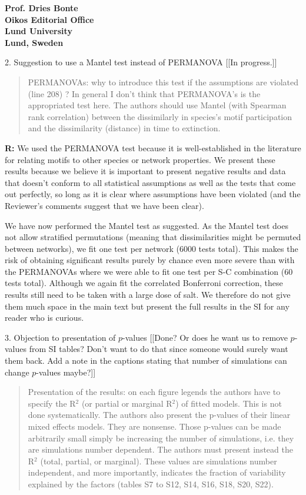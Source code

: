 \documentclass[12pt]{letter}
\begin{document}
\begin{letter}{\bf Prof. Dries Bonte\\
Oikos Editorial Office \\
Lund University \\
Lund, Sweden}
    \smallskip

    2. Suggestion to use a Mantel test instead of PERMANOVA [[In progress.]]

      \begin{quotation}
        PERMANOVAs: why to introduce this test if the assumptions are violated (line 208) ? In general I don’t think that PERMANOVA’s is the appropriated test here. The authors should use Mantel (with Spearman rank correlation) between the dissimilarly in species’s motif participation and the dissimilarity (distance) in time to extinction.
      \end{quotation}

      \smallskip

      \textbf{R:} We used the PERMANOVA test because it is well-established in the literature for relating motifs to other species or network properties. We present these results because we believe it is important to present negative results and data that doesn't conform to all statistical assumptions as well as the tests that come out perfectly, so long as it is clear where assumptions have been violated (and the Reviewer's comments suggest that we have been clear). 

      We have now performed the Mantel test as suggested. As the Mantel test does not allow stratified permutations (meaning that dissimilarities might be permuted between networks), we fit one test per network (6000 tests total). This makes the risk of obtaining significant results purely by chance even more severe than with the PERMANOVAs where we were able to fit one test per S-C combination (60 tests total). Although we again fit the correlated Bonferroni correction, these results still need to be taken with a large dose of salt. We therefore do not give them much space in the main text but present the full results in the SI for any reader who is curious.

    \smallskip

    3. Objection to presentation of $p$-values [[Done? Or does he want us to remove $p$-values from SI tables? Don't want to do that since someone would surely want them back. Add a note in the captions stating that number of simulations can change $p$-values maybe?]]

      \begin{quotation}
        Presentation of the results: on each figure legends the authors have to specify the R$^2$ (or partial  or marginal R$^2$) of fitted models. This is not done systematically. The authors also present the p-values of their linear mixed effects models. They are nonsense. Those p-values can be made arbitrarily small simply be increasing the number of simulations, i.e. they are simulations number dependent. The authors must present instead the R$^2$ (total, partial, or marginal). These values are simulations number independent, and more importantly, indicates the fraction of variability explained by the factors (tables S7 to S12, S14, S16, S18, S20, S22).
      \end{quotation}


\end{letter}
\end{document}
